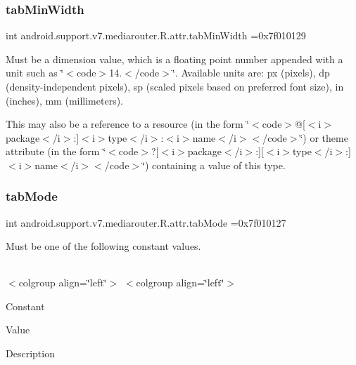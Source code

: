 \subsubsection{\texorpdfstring{tab\+Min\+Width}{tabMinWidth}}
{\footnotesize\ttfamily int android.\+support.\+v7.\+mediarouter.\+R.\+attr.\+tab\+Min\+Width =0x7f010129\hspace{0.3cm}{\ttfamily [static]}}

Must be a dimension value, which is a floating point number appended with a unit such as \char`\"{}$<$code$>$14.\+5sp$<$/code$>$\char`\"{}. Available units are\+: px (pixels), dp (density-\/independent pixels), sp (scaled pixels based on preferred font size), in (inches), mm (millimeters). 

This may also be a reference to a resource (in the form \char`\"{}$<$code$>$@\mbox{[}$<$i$>$package$<$/i$>$\+:\mbox{]}$<$i$>$type$<$/i$>$\+:$<$i$>$name$<$/i$>$$<$/code$>$\char`\"{}) or theme attribute (in the form \char`\"{}$<$code$>$?\mbox{[}$<$i$>$package$<$/i$>$\+:\mbox{]}\mbox{[}$<$i$>$type$<$/i$>$\+:\mbox{]}$<$i$>$name$<$/i$>$$<$/code$>$\char`\"{}) containing a value of this type. \mbox{\label{classandroid_1_1support_1_1v7_1_1mediarouter_1_1R_1_1attr_a598c6a873d7dba4fecfaefe13727745c}} 
\subsubsection{\texorpdfstring{tab\+Mode}{tabMode}}
{\footnotesize\ttfamily int android.\+support.\+v7.\+mediarouter.\+R.\+attr.\+tab\+Mode =0x7f010127\hspace{0.3cm}{\ttfamily [static]}}

Must be one of the following constant values.

\tabulinesep=1mm
\begin{longtabu} spread 0pt [c]{*{0}{|X[-1]}|}
\hline
\end{longtabu}
$<$colgroup align=\char`\"{}left\char`\"{}$>$ $<$colgroup align=\char`\"{}left\char`\"{}$>$ 

Constant

Value

Description 

